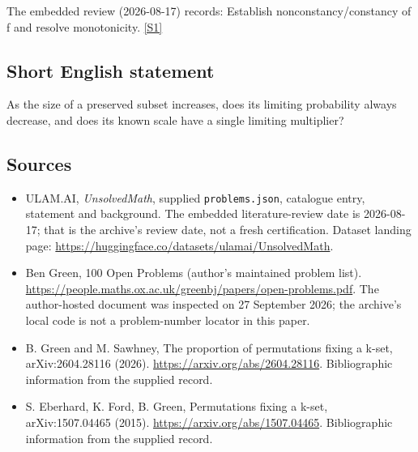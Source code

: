 \documentclass[11pt,a4paper]{article}
\newcommand{\sref}[2]{\hyperlink{source:#1:#2}{[S#2]}}
\begin{document}
The embedded review (2026-08-17) records: Establish nonconstancy/constancy of f and resolve monotonicity. \sref{statement}{1}

\subsection{Short English statement}

As the size of a preserved subset increases, does its limiting probability always decrease, and does its known scale have a single limiting multiplier?

\subsection{Sources}

{\small

\begin{itemize}

\item[\hypertarget{source:statement:1}{S1}] ULAM.AI, \emph{UnsolvedMath}, supplied \texttt{problems.json}, catalogue entry, statement and background. The embedded literature-review date is 2026-08-17; that is the archive’s review date, not a fresh certification. Dataset landing page: \url{https://huggingface.co/datasets/ulamai/UnsolvedMath}.

\item[\hypertarget{source:statement:2}{S2}] Ben Green, 100 Open Problems (author’s maintained problem list). \url{https://people.maths.ox.ac.uk/greenbj/papers/open-problems.pdf}. The author-hosted document was inspected on 27 September 2026; the archive’s local code is not a problem-number locator in this paper.

\item[\hypertarget{source:statement:3}{S3}] B. Green and M. Sawhney, The proportion of permutations fixing a k-set, arXiv:2604.28116 (2026). \url{https://arxiv.org/abs/2604.28116}. Bibliographic information from the supplied record.

\item[\hypertarget{source:statement:4}{S4}] S. Eberhard, K. Ford, B. Green, Permutations fixing a k-set, arXiv:1507.04465 (2015). \url{https://arxiv.org/abs/1507.04465}. Bibliographic information from the supplied record.

\end{itemize}

}

\label{end:statement}
\end{document}
